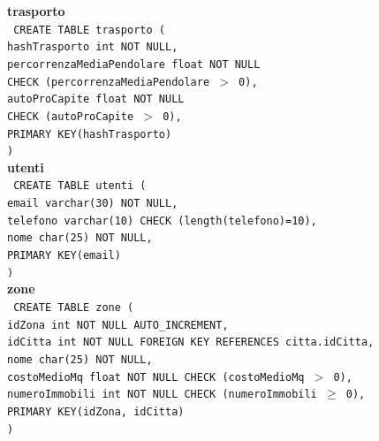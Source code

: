 \documentclass[a4paper,12pt]{report}
\begin{document}
                \noindent
                {\large \textbf{trasporto}} \\
                \texttt{
                    CREATE TABLE trasporto ( \\
                    \null\quad\quad hashTrasporto int NOT NULL, \\
                    \null\quad\quad percorrenzaMediaPendolare   float   NOT NULL \\
                            \null\qquad\qquad CHECK (percorrenzaMediaPendolare $>$ 0), \\
                    \null\quad\quad autoProCapite               float   NOT NULL \\
                            \null\qquad\qquad CHECK (autoProCapite $>$ 0), \\
                    \null\quad\quad PRIMARY KEY(hashTrasporto) \\
                    )
                } \\

                \noindent
                {\large \textbf{utenti}} \\
                \texttt{
                    CREATE TABLE utenti ( \\
                    \null\quad\quad email      varchar(30)     NOT NULL, \\
                    \null\quad\quad telefono    varchar(10)     CHECK (length(telefono)=10), \\
                    \null\quad\quad nome        char(25)    NOT NULL, \\
                    \null\quad\quad PRIMARY KEY(email) \\
                    )
                } \\

                \noindent
                {\large \textbf{zone}} \\
                \texttt{
                    CREATE TABLE zone ( \\
                    \null\quad\quad idZona          int         NOT NULL AUTO\_INCREMENT, \\
                    \null\quad\quad idCitta         int         NOT NULL FOREIGN KEY REFERENCES citta.idCitta, \\
                    \null\quad\quad nome            char(25)    NOT NULL, \\
                    \null\quad\quad costoMedioMq    float       NOT NULL CHECK (costoMedioMq $>$ 0), \\
                    \null\quad\quad numeroImmobili  int         NOT NULL CHECK (numeroImmobili $\geq$ 0), \\
                    \null\quad\quad PRIMARY KEY(idZona, idCitta) \\
                    )
                } \\
\end{document}
